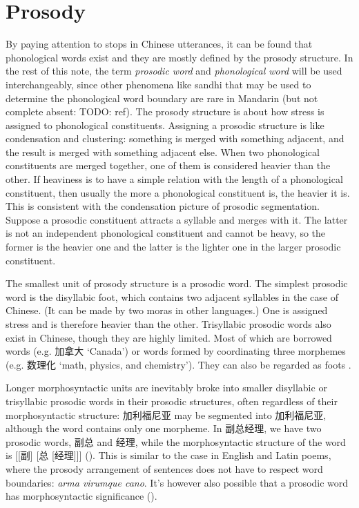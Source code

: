 \documentclass[UTF8, a4paper, oneside, scheme=plain, 12pt]{ctexrep}
\newcommand*{\citesec}[1]{\S~{#1}}
\newcommand*{\term}[1]{\emph{#1}}
\newcommand{\form}[1]{\emph{#1}}
\newcommand{\translate}[1]{`#1'}
\begin{document}
\section{Prosody}\label{sec:prosody-structure}

By paying attention to stops in Chinese utterances,
it can be found that phonological words exist and they are mostly defined by the prosody structure.
In the rest of this note,
the term \term{prosodic word} and \term{phonological word}
will be used interchangeably, 
since other phenomena like sandhi that may be used to 
determine the phonological word boundary 
are rare in Mandarin 
(but not complete absent: TODO: ref).
The prosody structure is about how stress is assigned to phonological constituents.
Assigning a prosodic structure is like condensation and clustering:
something is merged with something adjacent,
and the result is merged with something adjacent else.
When two phonological constituents are merged together,
one of them is considered heavier than the other.
If heaviness is to have a simple relation with the length of a phonological constituent,
then usually the more a phonological constituent is,
the heavier it is.
This is consistent with the condensation picture of prosodic segmentation.
Suppose a prosodic constituent attracts a syllable and merges with it.
The latter is not an independent phonological constituent
and cannot be heavy,
so the former is the heavier one and the latter is the lighter one in the larger prosodic constituent.

The smallest unit of prosody structure 
is a prosodic word.
The simplest prosodic word is the disyllabic foot, 
which contains two adjacent syllables in the case of Chinese.
(It can be made by two moras in other languages.)
One is assigned stress and is therefore heavier than the other.
Trisyllabic prosodic words also exist in Chinese,
though they are highly limited.
Most of which are borrowed words (e.g. 加拿大 \translate{Canada})
or words formed by coordinating three morphemes (e.g. 数理化 \translate{math, physics, and chemistry}).
They can also be regarded as foots \citep[\citesec{2.2}]{feng2000}.

Longer morphosyntactic units are 
inevitably broke into smaller disyllabic or trisyllabic prosodic words
in their prosodic structures,
often regardless of their morphosyntactic structure:
加利福尼亚 may be segmented into 加利\textbar 福尼亚, 
although the word contains only one morpheme.
In 副总经理,
we have two prosodic words,
副总 and 经理,
while the morphosyntactic structure of the word is [[副] [总 [经理]]]
().
This is similar to the case in English and Latin poems,
where the prosody arrangement of sentences does not have to respect word boundaries:
\form{arma vi\textbar rumque ca\textbar no}.
It's however also possible that 
a prosodic word has morphosyntactic significance
().
\end{document}
